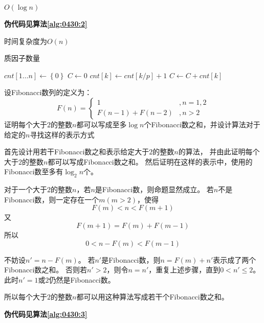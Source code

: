 \begin{questions}
\begin{solution}
        $O(\log n)$
    \end{solution}

    \begin{solution}
        \textbf{伪代码见算法\ref{alg:0430:2}}

        时间复杂度为$O(n)$
    \end{solution}

    \begin{algorithm}[!htp]
        \caption{质因子数量}\label{alg:0430:2}
        \begin{algorithmic}[1]
            \State $cnt[1 \dots n] \gets \left\{0\right\}$
            \State $C \gets 0$
            \State $cnt[k] \gets cnt[k/p] + 1$
            \State $C \gets C + cnt[k]$
            \EndIf
            \EndFor
        \end{algorithmic}
    \end{algorithm}

    \question 设Fibonacci数列的定义为：
    \[
        F(n) = \begin{cases}
            1             & , n=1,2 \\
            F(n-1)+F(n-2) & , n > 2
        \end{cases}
    \]
    证明每个大于$2$的整数$n$都可以写成至多$\log{n}$个Fibonacci数之和，并设计算法对于给定的$n$寻找这样的表示方式
    \begin{solution}
        首先设计用若干Fibonacci数之和表示给定大于$2$的整数$n$的算法，
        并由此证明每个大于$2$的整数$n$都可以写成Fibonacci数之和。
        然后证明在这样的表示中，使用的Fibonacci数至多有$\log_2{n}$个。

        对于一个大于$2$的整数$n$，若$n$是Fibonacci数，则命题显然成立。
        若$n$不是Fibonacci数，则一定存在一个$m(m>2)$，使得\[
            F(m) < n < F(m+1)
        \]
        又\[
            F(m+1) = F(m) + F(m-1)
        \]
        所以\[
            0 < n - F(m) < F(m-1)
        \]

        不妨设$n' = n - F(m)$。
        若$n'$是Fibonacci数，则$n = F(m) + n'$表示成了两个Fibonacci数之和。
        否则若$n' > 2$，则令$n=n'$，重复上述步骤，直到$0 < n' \le 2$。
        此时$n'=1$或$2$仍然是Fibonacci数。

        所以每个大于$2$的整数$n$都可以用这种算法写成若干个Fibonacci数之和。

        \textbf{伪代码见算法\ref{alg:0430:3}}


\end{solution}
\end{questions}
